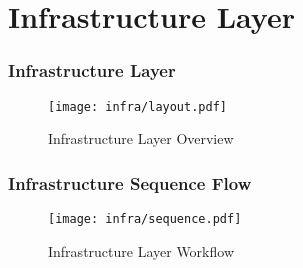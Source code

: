 \section{Infrastructure Layer}


\begin{frame}
  \frametitle{Infrastructure Layer}
  \begin{figure}
    \centering
    \texttt{[image: infra/layout.pdf]} %
    \caption{Infrastructure Layer Overview}
  \end{figure}
\end{frame}


\begin{frame}
    \frametitle{Infrastructure Sequence Flow}
    \begin{figure}
        \centering
        \texttt{[image: infra/sequence.pdf]} %
        \caption{Infrastructure Layer Workflow}
    \end{figure}
\end{frame}


